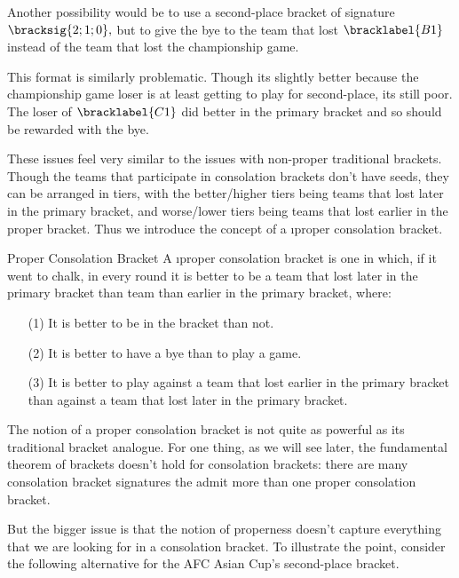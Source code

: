 {    Another possibility would be to use a second-place bracket of signature $\bracksig{2;1;0},$ but to give the bye to the team that lost $\bracklabel{B1}$ instead of the team that lost the championship game.


    This format is similarly problematic. Though its slightly better because the championship game loser is at least getting to play for second-place, its still poor. The loser of $\bracklabel{C1}$ did better in the primary bracket and so should be rewarded with the bye.

    These issues feel very similar to the issues with non-proper traditional brackets. Though the teams that participate in consolation brackets don't have seeds, they can be arranged in tiers, with the better/higher tiers being teams that lost later in the primary bracket, and worse/lower tiers being teams that lost earlier in the proper bracket. Thus we introduce the concept of a \i{proper consolation bracket}.

    \begin{definition}{Proper Consolation Bracket}{}
        A \i{proper consolation bracket} is one in which, if it went to chalk, in every round it is better to be a team that lost later in the primary bracket than team than earlier in the primary bracket, where: \begin{itemize}
            \item[(1)] It is better to be in the bracket than not.
            \item[(2)] It is better to have a bye than to play a game.
            \item[(3)] It is better to play against a team that lost earlier in the primary bracket than against a team that lost later in the primary bracket.
        \end{itemize}
    \end{definition}
    
    The notion of a proper consolation bracket is not quite as powerful as its traditional bracket analogue. For one thing, as we will see later, the fundamental theorem of brackets doesn't hold for consolation brackets: there are many consolation bracket signatures the admit more than one proper consolation bracket.

    But the bigger issue is that the notion of properness doesn't capture everything that we are looking for in a consolation bracket. To illustrate the point, consider the following alternative for the AFC Asian Cup's second-place bracket.

}
